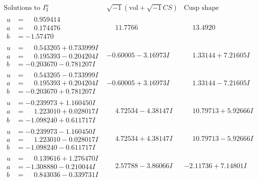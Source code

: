 \documentclass[1p]{elsarticle_modified}
\theoremstyle{definition}
\newcommand{\I}{\sqrt{-1}}
\begin{document}
$$\begin{array}{c|c|c}  
\text{Solutions to }I^u_{3}& \I (\text{vol} + \sqrt{-1}CS) & \text{Cusp shape}\\
 \hline 
\begin{aligned}
u &= \phantom{-}0.959414\phantom{ +0.000000I} \\
a &= \phantom{-}0.174476\phantom{ +0.000000I} \\
b &= -1.57470\phantom{ +0.000000I}\end{aligned}
 & \phantom{-}11.7766\phantom{ +0.000000I} & \phantom{-}13.4920\phantom{ +0.000000I} \\ \hline\begin{aligned}
u &= \phantom{-}0.543205 + 0.733999 I \\
a &= \phantom{-}0.195393 - 0.204204 I \\
b &= -0.203670 - 0.781207 I\end{aligned}
 & -0.60005 - 3.16973 I & \phantom{-}1.33144 + 7.21605 I \\ \hline\begin{aligned}
u &= \phantom{-}0.543205 - 0.733999 I \\
a &= \phantom{-}0.195393 + 0.204204 I \\
b &= -0.203670 + 0.781207 I\end{aligned}
 & -0.60005 + 3.16973 I & \phantom{-}1.33144 - 7.21605 I \\ \hline\begin{aligned}
u &= -0.239973 + 1.160450 I \\
a &= \phantom{-}1.223010 + 0.028017 I \\
b &= -1.098240 + 0.611717 I\end{aligned}
 & \phantom{-}4.72534 - 4.38147 I & \phantom{-}10.79713 + 5.92666 I \\ \hline\begin{aligned}
u &= -0.239973 - 1.160450 I \\
a &= \phantom{-}1.223010 - 0.028017 I \\
b &= -1.098240 - 0.611717 I\end{aligned}
 & \phantom{-}4.72534 + 4.38147 I & \phantom{-}10.79713 - 5.92666 I \\ \hline\begin{aligned}
u &= \phantom{-}0.139616 + 1.276470 I \\
a &= -1.308880 - 0.210044 I \\
b &= \phantom{-}0.843036 - 0.339731 I\end{aligned}
 & \phantom{-}2.57788 - 3.86066 I & -2.11736 + 7.14801 I \\ \hline\begin{aligned}

\end{aligned}
\end{array}$$
\end{document}
